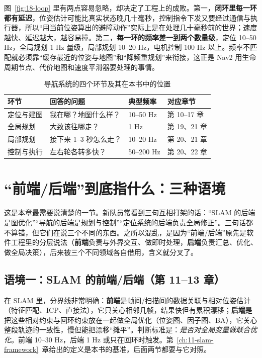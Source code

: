 图~\ref{fig:18-loop} 里有两点容易忽略，却决定了工程上的成败。第一，\textbf{闭环里每一环都有延迟}，位姿估计可能比真实状态晚几十毫秒，控制指令下发又要经过通信与执行器，所以“用当前位姿算出的避障动作”实际上是在处理几十毫秒前的世界；速度越快、延迟越大，越容易撞。第二，\textbf{每一环的频率差一到两个数量级}，定位 10--50 Hz，全局规划 1 Hz 量级，局部规划 10--20 Hz，电机控制 100 Hz 以上。频率不匹配就必须靠“缓存最近的位姿与地图”和“降频重规划”来衔接，这正是 Nav2 用生命周期节点、代价地图和速度平滑器要处理的事情。

\begin{table}[htbp]
  \centering
  \caption{导航系统的四个环节及其在本书中的位置}
  \label{tab:18-pipeline}
  \small
  \begin{tabular}{llll}
    \toprule
    环节 & 回答的问题 & 典型频率 & 对应章节 \\
    \midrule
    定位与建图 & 我在哪？地图什么样？ & 10--50 Hz & 第 10--17 章 \\
    全局规划 & 大致该往哪走？ & 1 Hz & 第 19、21 章 \\
    局部规划 & 接下来 1--3 秒怎么走？ & 10--20 Hz & 第 20、21 章 \\
    控制与执行 & 左右轮各转多快？ & 50--200 Hz & 第 20、22 章 \\
    \bottomrule
  \end{tabular}
\end{table}

\section{“前端/后端”到底指什么：三种语境}\label{sec:18-fb}

这是本章最需要说清楚的一节。新队员常看到三句互相打架的话：“SLAM 的后端是图优化”“导航的后端是规划与控制”“定位系统的后端负责全局修正”。三句话都不算错，但它们在说三个不同的东西。之所以混乱，是因为“前端/后端”原先是软件工程里的分层说法（\textbf{前端}负责与外界交互、做即时处理，\textbf{后端}负责汇总、优化、做全局决策），后来被三个不同领域各自借用，含义就分叉了。

\subsection{语境一：SLAM 的前端/后端（第 11--13 章）}

在 SLAM 里，分界线非常明确：\textbf{前端}是帧间/扫描间的数据关联与相对位姿估计（特征匹配、ICP、直接法），它只关心相邻几帧，结果快但有累积漂移；\textbf{后端}是把这些相对约束与回环约束放在一起做全局优化（位姿图、因子图、BA），它关心整段轨迹的一致性，慢但能把漂移“摊平”。判断标准是：\emph{是否对全局变量做联合优化}。前端 10--30 Hz，后端 1 Hz 或只在回环时触发。第~\ref{ch:11-slam-framework}~章给出的定义是本书的基准，后面两节都要与它对照。

